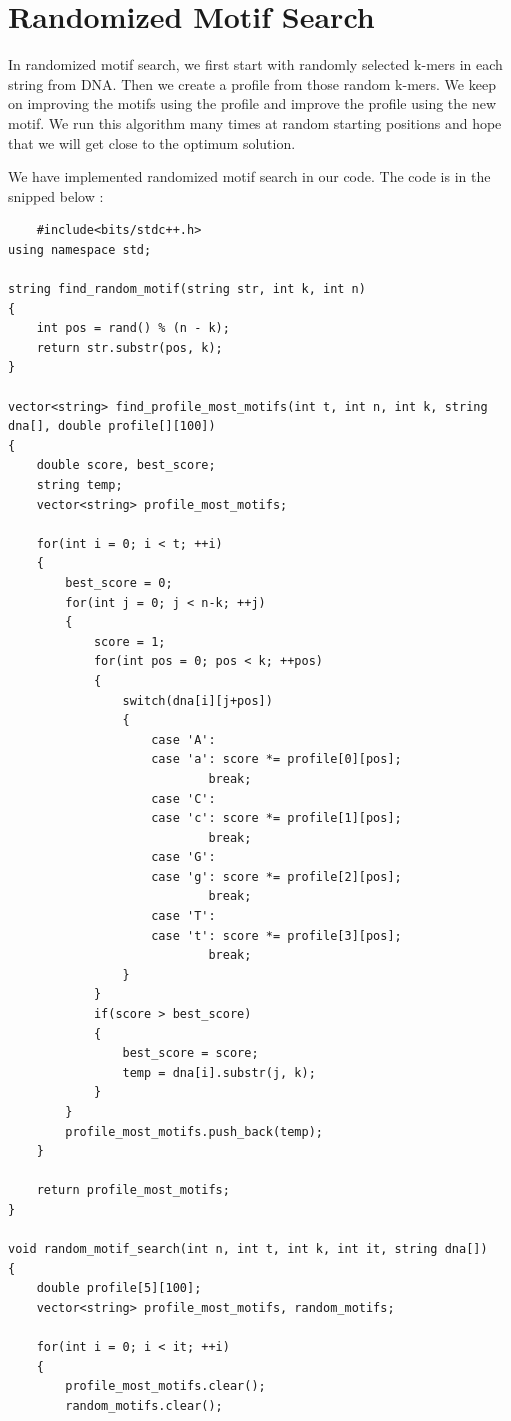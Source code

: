 \documentclass{report}
\begin{document}
\section{Randomized Motif Search}
In randomized motif search, we first start with randomly selected k-mers in each string from DNA. Then we create a profile from those random k-mers. We keep on improving the motifs using the profile and improve the profile using the new motif. We run this algorithm many times at random starting positions and hope that we will get close to the optimum solution.

We have implemented randomized motif search in our code. The code is in the snipped below :
\begin{verbatim}
    #include<bits/stdc++.h>
using namespace std;

string find_random_motif(string str, int k, int n)
{
    int pos = rand() % (n - k);
    return str.substr(pos, k);
}

vector<string> find_profile_most_motifs(int t, int n, int k, string dna[], double profile[][100])
{
    double score, best_score;
    string temp;
    vector<string> profile_most_motifs;

    for(int i = 0; i < t; ++i)
    {
        best_score = 0;
        for(int j = 0; j < n-k; ++j)
        {
            score = 1;
            for(int pos = 0; pos < k; ++pos)
            {
                switch(dna[i][j+pos])
                {
                    case 'A':
                    case 'a': score *= profile[0][pos];
                            break;
                    case 'C':
                    case 'c': score *= profile[1][pos];
                            break;
                    case 'G':
                    case 'g': score *= profile[2][pos];
                            break;
                    case 'T':
                    case 't': score *= profile[3][pos];
                            break;
                }
            }
            if(score > best_score)
            {
                best_score = score;
                temp = dna[i].substr(j, k);
            }
        }
        profile_most_motifs.push_back(temp);
    }

    return profile_most_motifs;
}

void random_motif_search(int n, int t, int k, int it, string dna[])
{
    double profile[5][100];
    vector<string> profile_most_motifs, random_motifs;

    for(int i = 0; i < it; ++i)
    {
        profile_most_motifs.clear();
        random_motifs.clear();


\end{verbatim}
\end{document}
